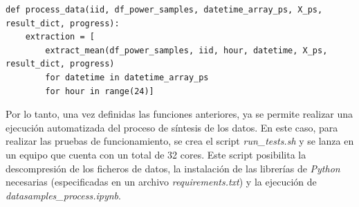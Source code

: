 \vspace{3mm}

\begin{lstlisting}[style=Python, caption={Función de automatización del cálculo del promedio}]
  def process_data(iid, df_power_samples, datetime_array_ps, X_ps, result_dict, progress):
    extraction = [
        extract_mean(df_power_samples, iid, hour, datetime, X_ps, result_dict, progress)
        for datetime in datetime_array_ps
        for hour in range(24)]
\end{lstlisting}

\vspace{3mm}

Por lo tanto, una vez definidas las funciones anteriores, ya se permite realizar una ejecución automatizada del proceso de síntesis de los datos. En este caso, para realizar las pruebas de funcionamiento, se crea el script \textit{run\_tests.sh} y se lanza en un equipo que cuenta con un total de 32 cores. Este script posibilita la descompresión de los ficheros de datos, la instalación de las librerías de \textit{Python} necesarias (especificadas en un archivo \textit{requirements.txt}) y la ejecución de \textit{datasamples\_process.ipynb}.

\vspace{3mm}


  
  
  
  
  
  
